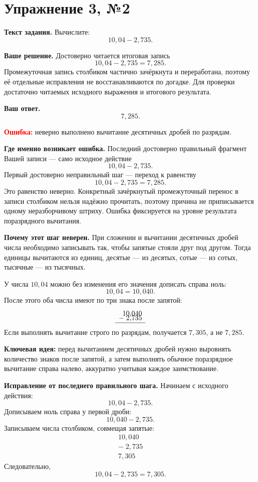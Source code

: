 \documentclass[12pt,a4paper]{article}
\begin{document}
\section*{Упражнение 3, №2}

\textbf{Текст задания.}
Вычислите:
\[
10{,}04-2{,}735.
\]

\textbf{Ваше решение.}
Достоверно читается итоговая запись
\[
10{,}04-2{,}735=7{,}285.
\]
Промежуточная запись столбиком частично зачёркнута и переработана, поэтому её отдельные исправления не восстанавливаются по догадке. Для проверки достаточно читаемых исходного выражения и итогового результата.

\textbf{Ваш ответ.}
\[
7{,}285.
\]

\textcolor{red}{\textbf{Ошибка:}} неверно выполнено вычитание десятичных дробей по разрядам.

\textbf{Где именно возникает ошибка.}
Последний достоверно правильный фрагмент Вашей записи --- само исходное действие
\[
10{,}04-2{,}735.
\]
Первый достоверно неправильный шаг --- переход к равенству
\[
10{,}04-2{,}735=7{,}285.
\]
Это равенство неверно. Конкретный зачёркнутый промежуточный перенос в записи столбиком нельзя надёжно прочитать, поэтому причина не приписывается одному неразборчивому штриху. Ошибка фиксируется на уровне результата поразрядного вычитания.

\textbf{Почему этот шаг неверен.}
При сложении и вычитании десятичных дробей числа необходимо записывать так, чтобы запятые стояли друг под другом. Тогда единицы вычитаются из единиц, десятые --- из десятых, сотые --- из сотых, тысячные --- из тысячных.

У числа $10{,}04$ можно без изменения его значения дописать справа ноль:
\[
10{,}04=10{,}040.
\]
После этого оба числа имеют по три знака после запятой:
\[
\begin{array}{r}
10{,}040\\[-2mm]
-\;2{,}735\\
\hline
\end{array}
\]
Если выполнять вычитание строго по разрядам, получается $7{,}305$, а не $7{,}285$.

\textcolor{blue!60!black}{\textbf{Ключевая идея:}}
перед вычитанием десятичных дробей нужно выровнять количество знаков после запятой, а затем выполнять обычное поразрядное вычитание справа налево, аккуратно учитывая каждое заимствование.

\textbf{Исправление от последнего правильного шага.}
Начинаем с исходного действия:
\[
10{,}04-2{,}735.
\]
Дописываем ноль справа у первой дроби:
\[
10{,}040-2{,}735.
\]
Записываем числа столбиком, совмещая запятые:
\[
\begin{array}{r}
10{,}040\\[-2mm]
-\;2{,}735\\
\hline
7{,}305
\end{array}
\]
Следовательно,
\[
10{,}04-2{,}735=7{,}305.
\]
\end{document}
